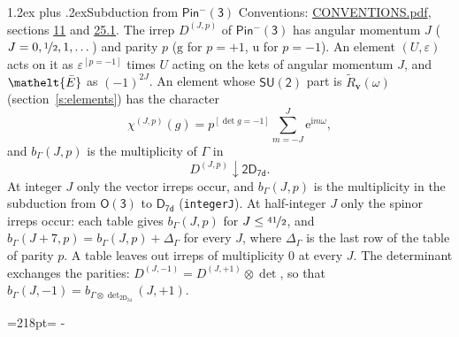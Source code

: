 \documentclass[10pt,a4paper]{article}
\makeatletter
\renewcommand\section{\@startsection{section}{1}{\z@}{-3ex plus -1ex minus -.2ex}%
  {1.2ex plus .2ex}{\normalfont\large\sffamily\bfseries\color{parttitle}}}
\newcommand{\needspace}[1]{\par\penalty-100\begingroup\dimen0=#1\relax\dimen2=\pagegoal
  \advance\dimen2-\pagetotal\ifdim\dimen0>\dimen2\relax\ifdim\dimen2>0pt\vfil\break\fi\fi
  \endgroup}
\numberwithin{equation}{section}
\newcommand{\eltfont}[1]{{\let\sigma\eltsigma\mathelt{#1}}}
\newcommand{\grp}[1]{\mathsf{#1}}
\newcommand{\elt}[1]{\eltfont{#1}}
\newcommand{\ptag}[1]{\mathrm{#1}}
\newcommand{\iverson}[1]{[#1]}
\newcommand{\restr}[2]{#1\!\downarrow#2}
\newcommand{\vv}{\mathbf{v}}
\newcommand{\iunit}{\mathrm{i}}
\newcommand{\expe}{\mathrm{e}}
\newcommand{\irrJp}[2]{D^{(#1,#2)}}
\newcommand{\irrprod}{\otimes}
\newcommand{\barred}[1]{\bar{#1}}
\newcommand{\lift}[1]{\tilde{#1}}
\makeatother
\begin{document}
\section{Subduction from \texorpdfstring{$\grp{Pin^{-}(3)}$}{Pin(3)}}\label{s:subduction_parent}
Conventions: \href{../../CONVENTIONS.pdf}{CONVENTIONS.pdf}, sections \href{../../../rotation/CONVENTIONS.pdf\#conv.11}{11} and \href{../../CONVENTIONS.pdf\#conv.25.1}{25.1}.
\leavevmode\label{n:index.J}\label{n:index.parity}\label{n:irrep.o3}The irrep $\irrJp{J}{p}$ of \href{Pinminus3.pdf}{$\grp{Pin^{-}(3)}$} has angular momentum $J$ ($J = 0, \nicefrac{1}{2}, 1, \dots$) and parity $p$ ($\ptag{g}$ for $p = +1$, $\ptag{u}$ for $p = -1$). An element $(U, \varepsilon)$ acts on it as $\varepsilon^{[p = -1]}$ times $U$ acting on the kets of angular momentum $J$, and $\elt{\barred{E}}$ as $(-1)^{2J}$. \label{n:function.character.parent}\label{n:function.multiplicity}An element whose $\grp{SU(2)}$ part is $\lift{R}_{\vv}(\omega)$ (section~\ref{s:elements}) has the character
\begin{equation}\label{e:chi}\chi^{(J,p)}(g) = p^{\iverson{\det g = -1}}\sum_{m=-J}^{J} \expe^{\iunit m\omega},\end{equation}
and $b_\Gamma(J, p)$ is the multiplicity of $\Gamma$ in
\begin{equation}\label{e:parent}\restr{\irrJp{J}{p}}{\grp{2D_{7d}}}.\end{equation}
At integer $J$ only the vector irreps occur, and $b_\Gamma(J, p)$ is the multiplicity in the subduction from $\grp{O(3)}$ to \href{../../../rotation/data/pdf/D7d.pdf}{$\grp{D_{7d}}$} (\texttt{integerJ}). \label{n:index.increment}At half-integer $J$ only the spinor irreps occur: each table gives $b_\Gamma(J, p)$ for $J \le \nicefrac{41}{2}$, and $b_\Gamma(J + 7, p) = b_\Gamma(J, p) + \Delta_\Gamma$ for every $J$, where $\Delta_\Gamma$ is the last row of the table of parity $p$. A table leaves out irreps of multiplicity 0 at every $J$.
\leavevmode\label{n:operator.determinant.character}The determinant exchanges the parities: $\irrJp{J}{-1} = \irrJp{J}{+1} \irrprod \det$, so that $b_\Gamma(J, -1) = b_{\Gamma \irrprod \det_{\grp{2D_{7d}}}}(J, +1)$.
\needspace{218pt}
\end{document}
